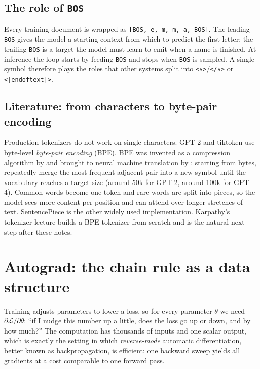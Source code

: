 \documentclass[11pt,letterpaper]{article}
\theoremstyle{remark}
\newcommand{\BOS}{\texttt{BOS}}
\begin{document}
\subsection{The role of \BOS}

Every training document is wrapped as \texttt{[BOS, e, m, m, a, BOS]}. The leading \BOS{} gives the model a starting context from which to predict the first letter; the trailing \BOS{} is a target the model must learn to emit when a name is finished. At inference the loop starts by feeding \BOS{} and stops when \BOS{} is sampled. A single symbol therefore plays the roles that other systems split into \texttt{<s>}/\texttt{</s>} or \texttt{<|endoftext|>}.

\subsection{Literature: from characters to byte-pair encoding}

Production tokenizers do not work on single characters. GPT-2 \parencite{radford2019gpt2} and tiktoken \parencite{openai2022tiktoken} use byte-level \emph{byte-pair encoding} (BPE). BPE was invented as a compression algorithm by \textcite{gage1994bpe} and brought to neural machine translation by \textcite{sennrich2016bpe}: starting from bytes, repeatedly merge the most frequent adjacent pair into a new symbol until the vocabulary reaches a target size (around 50k for GPT-2, around 100k for GPT-4). Common words become one token and rare words are split into pieces, so the model sees more content per position and can attend over longer stretches of text. SentencePiece \parencite{kudo2018sentencepiece} is the other widely used implementation. Karpathy's tokenizer lecture \parencite{karpathy2024tokenizervideo} builds a BPE tokenizer from scratch and is the natural next step after these notes.

\section{Autograd: the chain rule as a data structure}
\label{sec:autograd}

Training adjusts parameters to lower a loss, so for every parameter $\theta$ we need $\partial \mathcal L/\partial\theta$: ``if I nudge this number up a little, does the loss go up or down, and by how much?'' The computation has thousands of inputs and one scalar output, which is exactly the setting in which \emph{reverse-mode} automatic differentiation, better known as backpropagation, is efficient: one backward sweep yields all gradients at a cost comparable to one forward pass.
\end{document}

